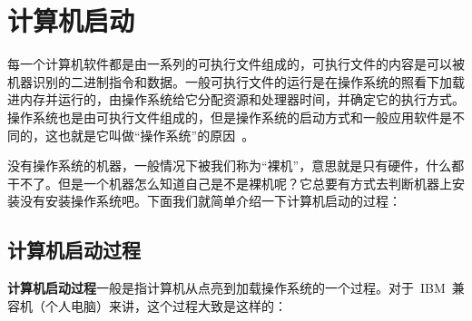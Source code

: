 \chapter{计算机启动} \label{CHboot}

每一个计算机软件都是由一系列的可执行文件组成的，可执行文件的内容是可以被机器识别的二进制指令和数据。一般可执行文件的运行是在操作系统的照看下加载进内存并运行的，由操作系统给它分配资源和处理器时间，并确定它的执行方式。操作系统也是由可执行文件组成的，但是操作系统的启动方式和一般应用软件是不同的，这也就是它叫做“操作系统”的原因~\smiley。

没有操作系统的机器，一般情况下被我们称为“裸机”，意思就是只有硬件，什么都干不了。但是一个机器怎么知道自己是不是裸机呢？它总要有方式去判断机器上安装没有安装操作系统吧。下面我们就简单介绍一下计算机启动的过程：

\section{计算机启动过程} \label{CHboot_boot}

\textbf{计算机启动过程}一般是指计算机从点亮到加载操作系统的一个过程。对于~IBM~兼容机（个人电脑）来讲，这个过程大致是这样的：

